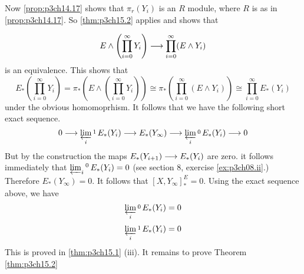 \documentclass[../main]{subfiles}
\begin{document}
Now \ref{prop:p3ch14.17} shows that $\pi_r(Y_i)$ is an $R$ module, where $R$ is as in \ref{prop:p3ch14.17}. So \ref{thm:p3ch15.2} applies and shows that 

$$E\wedge\left(\prod_{i=0}^\infty Y_i \right)\overset{}{\longrightarrow}\prod_{i=0}^\infty (E\wedge Y_i) $$
is an equivalence. This shows that $$E_\ast\left(\prod_{i=0}^\infty Y_i \right)= \pi_\ast\left(E\wedge \left(\prod_{i=0}^\infty Y_i \right)\right) \cong \pi_\ast\left(\prod_{i=0}^\infty (E\wedge Y_i) \right)\cong \prod_{i=0}^\infty E_\ast(Y_i)$$
under the obvious homomoprhism. It follows that we have the following short exact sequence.
$$0\overset{}{\longrightarrow} \varprojlim_i\mathop{\mathrm{}}^1E_\ast(Y_i) \overset{}{\longrightarrow} E_\ast(Y_\infty)\overset{}{\longrightarrow}\varprojlim_i\mathop{\mathrm{}}^0 E_\ast(Y_i)\overset{}{\longrightarrow} 0$$
But by the construction the maps $E_\ast(Y_{i+1})\overset{}{\longrightarrow} E_\ast (Y_i)$ are zero. it follows immediately that $\varprojlim_i\mathop{\mathrm{}}^0 E_\ast(Y_i)=0$ (see section 8, exercise \ref{ex:p3ch08.ii}.) Therefore $E_\ast(Y_\infty)=0$. It follows that $[X,Y_\infty]_\ast^E=0$. Using the exact sequence above, we have $$\varprojlim_i\mathop{\mathrm{}}^0E_\ast(Y_i) =0$$ $$\varprojlim_i\mathop{\mathrm{}}^1E_\ast(Y_i)=0 $$
This is proved in \ref{thm:p3ch15.1} (iii). It remains to prove Theorem \ref{thm:p3ch15.2}
\end{document}
